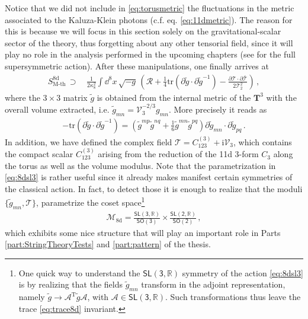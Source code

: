 Notice that we did not include in \eqref{eq:torusmetric} the fluctuations in the metric associated to the Kaluza-Klein photons (c.f. eq. \eqref{eq:11dmetric}). The reason for this is because we will focus in this section solely on the gravitational-scalar sector of the theory, thus forgetting about any other tensorial field, since it will play no role in the analysis performed in the upcoming chapters (see \cite{Salam:1984ft} for the full supersymmetric action). After these manipulations, one finally arrives at
%
\begin{align}\label{eq:8dsl3}
	S_\text{M-th}^{\text{8d}}\, \supset\, &\frac{1}{2\kappa_8^2} \int \dd^{8}x\, \sqrt{-g}\,  \left( \mathcal{R} + \frac{1}{4} \text{tr} \left( \partial \tilde{g} \cdot \partial \tilde{g}^{-1} \right) -\frac{\partial \mathcal{T} \cdot \partial \bar{\mathcal{T}}}{2 \mathcal{T}_2^2} \right)\, ,
\end{align}
%
where the $3\times3$ matrix $\tilde{g}$ is obtained from the internal metric of the $\mathbf{T}^3$ with the overall volume extracted, i.e. $\tilde{g}_{m n}= \mathcal{V}_3^{-2/3} g_{mn}$. More precisely it reads as
%
\begin{align}\label{eq:trace8d}
	-\text{tr} \left( \partial \tilde{g} \cdot \partial \tilde{g}^{-1} \right) = \left(\tilde{g}^{m p} \tilde{g}^{n q}+ \frac{1}{6} \tilde{g}^{mn} \tilde{g}^{pq} \right) \partial \tilde{g}_{mn} \cdot \partial \tilde{g}_{pq}\, .
\end{align}
%
In addition, we have defined the complex field $\mathcal{T}=C_{123}^{(3)} + \text{i} \mathcal{V}_3$, which contains the compact scalar $C_{123}^{(3)}$ arising from the reduction of the 11d 3-form $C_3$ along the torus as well as the volume modulus. Note that the parametrization in \eqref{eq:8dsl3} is rather useful since it already makes manifest certain symmetries of the classical action. In fact, to detect those it is enough to realize that the moduli $\{ \tilde{g}_{m n}, \mathcal{T}\}$, parametrize the coset space\footnote{One quick way to understand the $\mathsf{SL(3, \mathbb{R})}$ symmetry of the action \eqref{eq:8dsl3} is by realizing that the fields $\tilde g_{mn}$ transform in the adjoint representation, namely $\tilde g \to \mathcal{A}^{\text{T}} \tilde g \mathcal{A}$, with $\mathcal{A} \in \mathsf{SL(3, \mathbb{R})}$. Such transformations thus leave the trace \eqref{eq:trace8d} invariant.}
%
\begin{align}
	\mathcal{M}_{\text{8d}} = \frac{\mathsf{SL(3, \mathbb{R})}}{\mathsf{SO(3)}} \times \frac{\mathsf{SL(2, \mathbb{R})}}{\mathsf{SO(2)}}\, ,
\end{align}
%
which exhibits some nice structure that will play an important role in Parts \ref{part:StringTheoryTests} and \ref{part:pattern} of the thesis.

